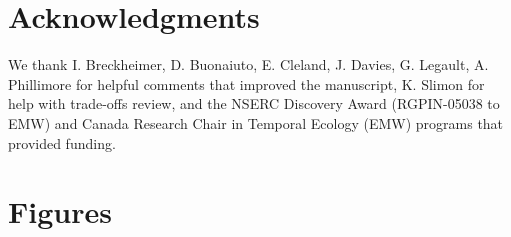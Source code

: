 \documentclass[11pt,letterpaper]{article}
\begin{document}
\section{Acknowledgments}
We thank I. Breckheimer, D. Buonaiuto, E. Cleland, J. Davies, G. Legault, A. Phillimore for helpful comments that improved the manuscript, K. Slimon for help with trade-offs review, and the NSERC Discovery Award (RGPIN-05038 to EMW) and Canada Research Chair in Temporal Ecology (EMW) programs that provided funding. 








\clearpage
\section{Figures}
\end{document}
